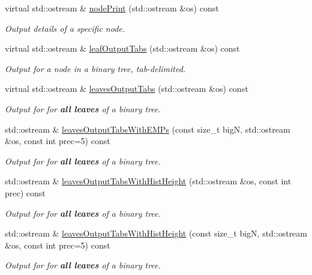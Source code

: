 \begin{DoxyCompactItemize}
virtual std\-::ostream \& \hyperlink{classsubpavings_1_1SPSnode_aba02715cb75f803df7c3ffd1eaf027e8}{node\-Print} (std\-::ostream \&os) const 
\begin{DoxyCompactList}\small\item\em \-Output details of a specific node. \end{DoxyCompactList}\item 
virtual std\-::ostream \& \hyperlink{classsubpavings_1_1SPSnode_a3cc0c8bb64c854ef16ba03891f5945d6}{leaf\-Output\-Tabs} (std\-::ostream \&os) const 
\begin{DoxyCompactList}\small\item\em \-Output for a node in a binary tree, tab-\/delimited. \end{DoxyCompactList}\item 
virtual std\-::ostream \& \hyperlink{classsubpavings_1_1SPSnode_abe732a753f432c2239c9f82a47d089b1}{leaves\-Output\-Tabs} (std\-::ostream \&os) const 
\begin{DoxyCompactList}\small\item\em \-Output for for {\bfseries all leaves} of a binary tree. \end{DoxyCompactList}\item 
std\-::ostream \& \hyperlink{classsubpavings_1_1SPSnode_a817a8a29925937c189cc009366fe6bfb}{leaves\-Output\-Tabs\-With\-E\-M\-Ps} (const size\-\_\-t big\-N, std\-::ostream \&os, const int prec=5) const 
\begin{DoxyCompactList}\small\item\em \-Output for for {\bfseries all leaves} of a binary tree. \end{DoxyCompactList}\item 
std\-::ostream \& \hyperlink{classsubpavings_1_1SPSnode_a11c1e7c0e652b891c08dfefebd285904}{leaves\-Output\-Tabs\-With\-Hist\-Height} (std\-::ostream \&os, const int prec) const 
\begin{DoxyCompactList}\small\item\em \-Output for for {\bfseries all leaves} of a binary tree. \end{DoxyCompactList}\item 
std\-::ostream \& \hyperlink{classsubpavings_1_1SPSnode_a7f8027e04d883efdf7b627208775b989}{leaves\-Output\-Tabs\-With\-Hist\-Height} (const size\-\_\-t big\-N, std\-::ostream \&os, const int prec=5) const 
\begin{DoxyCompactList}\small\item\em \-Output for for {\bfseries all leaves} of a binary tree. \end{DoxyCompactList}\item 

\end{DoxyCompactItemize}
